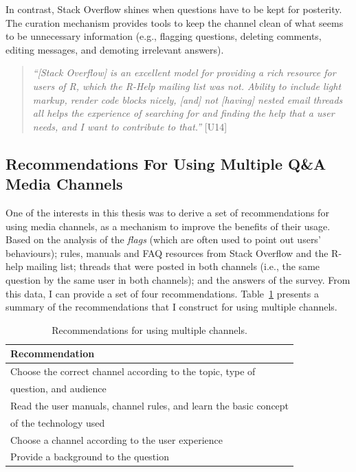 \documentclass{sig-alternate-05-2015}
\begin{document}
	In contrast, Stack Overflow shines when questions have to be kept for posterity. 
	The curation mechanism provides tools to keep the channel clean of what seems to be unnecessary information (e.g., flagging questions, deleting comments, editing messages, and demoting irrelevant answers).

    \begin{quote}
        \textit{``[Stack Overflow] is an excellent model for providing a rich resource for users of R, which the R-Help mailing list was not. 
        Ability to include light markup, render code blocks nicely, [and] not [having] nested email threads all helps the experience of searching for and finding the help that a user needs, and I want to contribute to that.''} [U14]
	\end{quote}

\subsection{Recommendations For Using Multiple Q\&A Media Channels}

	One of the interests in this thesis was to derive a set of recommendations for using media channels, as a mechanism to improve the benefits of their usage.
	Based on the analysis of the \textit{flags} (which are often used to point out users' behaviours); rules, manuals and FAQ resources from Stack Overflow and the R-help mailing list; threads that were posted in both channels (i.e., the same question by the same user in both channels); and the answers of the survey.
	From this data, I can provide a set of four recommendations.
	Table~\ref{table:recomendations} presents a summary of the recommendations that I construct for using multiple channels.

    \begin{table}[!htb]
      \centering
	  \caption{Recommendations for using multiple channels.}
	  \label{table:recomendations}
	  \begin{tabular}{@{}l@{}}
        \toprule
        \textbf{Recommendation}\\
        \midrule
			Choose the correct channel according to the topic, type of\\
		    \hspace{3em}question, and audience \\
			Read the user manuals, channel rules, and learn the basic concept\\
			\hspace{3em}of the technology used \\
			Choose a channel according to the user experience \\
			Provide a background to the question \\
        \bottomrule
	  \end{tabular}
	\end{table}
\end{document}

